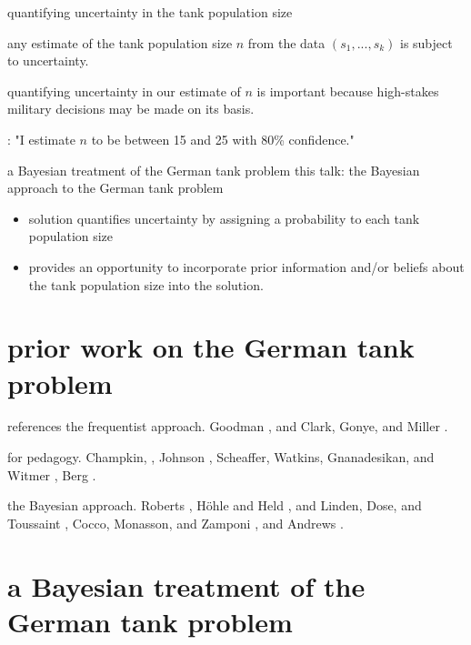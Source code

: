 \documentclass[10pt]{beamer}
\newcommand{\data}{$(s_1, ..., s_k)$\xspace}
\begin{document}
\begin{frame}[t]{quantifying uncertainty in the tank population size}



 any estimate of the tank population size $n$ from the data \data is subject to uncertainty.

\pause 
quantifying uncertainty in our estimate of $n$ is important because high-stakes military decisions may be made on its basis.

: "I estimate $n$ to be between 15 and 25 with 80\% confidence."

\end{frame}

\begin{frame}[t]{a Bayesian treatment of the German tank problem}
	\alert{this talk}: the Bayesian approach to the German tank problem 
	\begin{itemize}
		\item solution quantifies uncertainty by assigning a probability to each tank population size
		\pause 
		\item provides an opportunity to incorporate prior information and/or beliefs about the tank population size into the solution.
	\end{itemize}
\end{frame}

\section{prior work on the German tank problem}


\begin{frame}[t]{references}
\alert{the frequentist approach.}
Goodman , and Clark, Gonye, and Miller . 

\alert{for pedagogy.} Champkin, ,
Johnson ,
Scheaffer, Watkins, Gnanadesikan, and Witmer , Berg .

\alert{the Bayesian approach.}
Roberts , H{\"o}hle and Held , and Linden, Dose, and Toussaint , Cocco, Monasson, and Zamponi , and Andrews .
\end{frame}


\section{a Bayesian treatment of the German tank problem}
\end{document}
